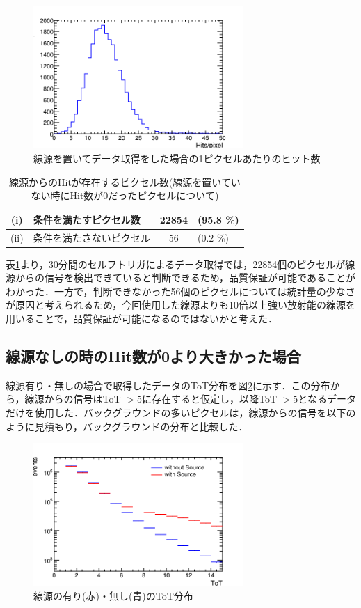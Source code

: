 \begin{figure}[h]
  \centering
  \includegraphics[width=8cm]{./figure/selfperpixw.png}
  \caption{線源を置いてデータ取得をした場合の1ピクセルあたりのヒット数}
  \label{fig:numhitdist}
\end{figure}

\begin{table}[h]
  \centering
  \caption{線源からのHitが存在するピクセル数(線源を置いていない時にHit数が0だったピクセルについて)}
  \begin{tabular}{|cl|cl|} \hline
    (i) & 条件を満たすピクセル数 & 22854 & (95.8 \%) \\ \hline
    (ii) & 条件を満たさないピクセル & 56 & (0.2 \%) \\ \hline
  \end{tabular}
  \label{tab:0hitdist}
\end{table}

表\ref{tab:0hitdist}より，30分間のセルフトリガによるデータ取得では，22854個のピクセルが線源からの信号を検出できていると判断できるため，品質保証が可能であることがわかった．一方で，判断できなかった56個のピクセルについては統計量の少なさが原因と考えられるため，今回使用した線源よりも10倍以上強い放射能の線源を用いることで，品質保証が可能になるのではないかと考えた．

\subsection*{線源なしの時のHit数が0より大きかった場合}
線源有り・無しの場合で取得したデータのToT分布を図\ref{fig:selftot}に示す．この分布から，線源からの信号はToT $> 5$に存在すると仮定し，以降ToT $>5$となるデータだけを使用した．バックグラウンドの多いピクセルは，線源からの信号を以下のように見積もり，バックグラウンドの分布と比較した．

\begin{figure}[h]
  \centering
  \includegraphics[width=8cm]{./figure/selftot.png}
  \caption{線源の有り(赤)・無し(青)のToT分布}
  \label{fig:selftot}
\end{figure}


